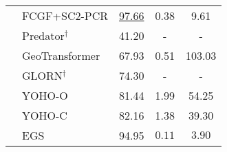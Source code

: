 \begin{table}[ht!]
\begin{tabular}{|c|l|c|c|c|}
    & FCGF+SC2-PCR \citep{SC2-PCR} & \underline{97.66} &  0.38  &  9.61 \\
    \cmidrule{2-5}
    & Predator$^\dagger$ \citep{predator} & 41.20 & - & - \\
    & GeoTransformer \citep{geometric-transformer-for-fast-registration} & 67.93  & 0.51 & 103.03 \\
    & GLORN$^\dagger$ \citep{GLORN} & 74.30 & - & - \\
    & YOHO-O \citep{YOHO} & 81.44  & 1.99  & 54.25      \\
    & YOHO-C \citep{YOHO} & 82.16  & 1.38   &  39.30     \\
    \hline
    \multicolumn{1}{c|}{} & EGS & 94.95  & $\mathbf{0.11}$ & $\mathbf{3.90}$ \\
    \cmidrule{2-5}
    \end{tabular}
    \label{tab:KITTI-results-2m}
    \end{table}